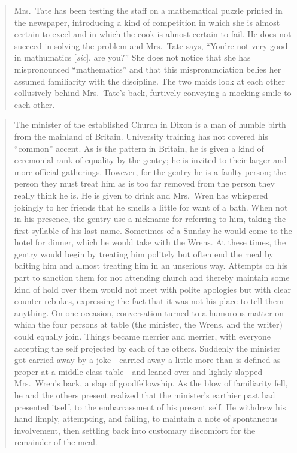 \documentclass[twoside,symmetric,nobib,justified]{tufte-book}
\begin{document}
\begin{quote}
Mrs.~Tate has been testing the staff on a mathematical puzzle printed in
the newspaper, introducing a kind of competition in which she is almost
certain to excel and in which the cook is almost certain to fail. He
does not succeed in solving the problem and Mrs.~Tate says, ``You're not
very good in mathumatics {[}\emph{sic}{]}, are you?'' She does not
notice that she has mispronounced ``mathematics'' and that this
mispronunciation belies her assumed familiarity with the discipline. The
two maids look at each other collusively behind Mrs.~Tate's back,
furtively conveying a mocking smile to each other.
\end{quote}

\begin{quote}
The minister of the established Church in Dixon is a man of humble birth
from the mainland of Britain. University training has not covered his
``common'' accent. As is the pattern in Britain, he is given a kind of
ceremonial rank of equality by the gentry; he is invited to their larger
and more official gatherings. However, for the gentry he is a faulty
person; the person they must treat him as is too far removed from the
person they really think he is. He is given to drink and Mrs.~Wren has
whispered jokingly to her friends that he smells a little for want of a
bath. When not in his presence, the gentry use a nickname for referring
to him, taking the first syllable of his last name. Sometimes of a
Sunday he would come to the hotel for dinner, which he would take with
the Wrens. At these times, the gentry would begin by treating him
politely but often end the meal by baiting him and almost treating him
in an unserious way. Attempts on his part to sanction them for not
attending church and thereby maintain some kind of hold over them would
not meet with polite apologies but with clear counter-rebukes,
expressing the fact that it was not his place to tell them anything. On
one occasion, conversation turned to a humorous matter on which the four
persons at table (the minister, the Wrens, and the writer) could equally
join. Things became merrier and merrier, with everyone accepting the
self projected by each of the others. Suddenly the minister got carried
away by a joke---carried away a little more than is defined as proper at
a middle-class table---and leaned over and lightly slapped Mrs.~Wren's
back, a slap of goodfellowship. As the blow of familiarity fell, he and
the others present realized that the minister's earthier past had
presented itself, to the embarrassment of his present self. He withdrew
his hand limply, attempting, and failing, to maintain a note of
spontaneous involvement, then settling back into customary discomfort
for the remainder of the meal.
\end{quote}
\end{document}
